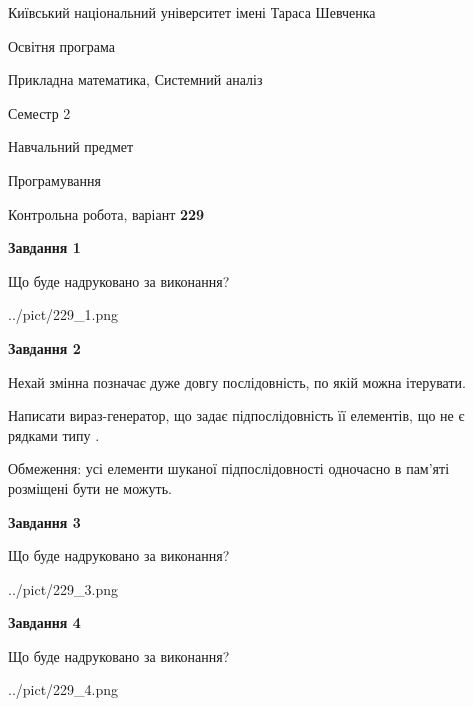 \documentclass[12pt, ukrainian]{article}
\begin{document}
{{\begin {small}\par
{ \center  Київський національний університет імені Тараса Шевченка \par}
{\parbox {5 cm}{Освітня програма \hfill}{\parbox {8 cm}{Прикладна математика, Системний аналіз \hfill}}\parbox {5 cm}{\hfill Семестр 2}}\par
{\parbox {5 cm} {Навчальний предмет \hfill}\parbox {7 cm}{Програмування \hfill}\parbox {6cm}{\hfill}\par}\vspace{-7pt} \end{small}}{\center Контрольна робота, варіант  \No \textbf
{ 229 }\par}}
{
\begin {large}
{\begin {center}\textbf{Завдання 1}\end {center}}\par
Що буде надруковано за виконання?\par\par
\begin{center}
	{../pict/229_1.png}
\end{center}
\newpage

{\begin {center}\textbf{Завдання 2}\end {center}}\par
Нехай змінна  позначає дуже довгу послідовність, по якій можна ітерувати.

Написати вираз-генератор, що задає підпослідовність її елементів, що не є рядками типу .

Обмеження: усі елементи шуканої підпослідовності одночасно в пам'яті розміщені бути не можуть.\par
\newpage

{\begin {center}\textbf{Завдання 3}\end {center}}\par
Що буде надруковано за виконання?\par
\begin{center}
	{../pict/229_3.png}
\end{center}
\newpage

{\begin {center}\textbf{Завдання 4}\end {center}}\par
Що буде надруковано за виконання?\par
\begin{center}
	{../pict/229_4.png}
\end{center}
\newpage


\end{large}}
\end{document}
